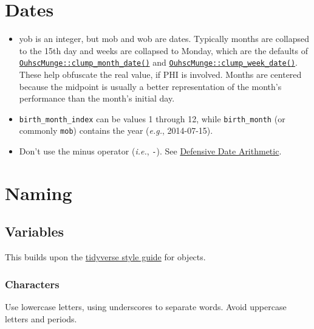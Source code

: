 \documentclass[
]{book}
\begin{document}
\hypertarget{style-dates}{%
\section{Dates}\label{style-dates}}

\begin{itemize}
\item
  yob is an integer, but mob and wob are dates. Typically months are collapsed to the 15th day and weeks are collapsed to Monday, which are the defaults of \href{http://ouhscbbmc.github.io/OuhscMunge/reference/clump_date.html}{\texttt{OuhscMunge::clump\_month\_date()}} and \href{http://ouhscbbmc.github.io/OuhscMunge/reference/clump_date.html}{\texttt{OuhscMunge::clump\_week\_date()}}. These help obfuscate the real value, if PHI is involved. Months are centered because the midpoint is usually a better representation of the month's performance than the month's initial day.
\item
  \texttt{birth\_month\_index} can be values 1 through 12, while \texttt{birth\_month} (or commonly \texttt{mob}) contains the year (\emph{e.g.}, 2014-07-15).
\item
  Don't use the minus operator (\emph{i.e.}, \texttt{-}). See \protect\hyperlink{coding-defensive-date-arithmetic}{Defensive Date Arithmetic}.
\end{itemize}

\hypertarget{naming}{%
\section{Naming}\label{naming}}

\hypertarget{style-naming-variables}{%
\subsection{Variables}\label{style-naming-variables}}

This builds upon the \href{https://style.tidyverse.org/syntax.html\#object-names}{tidyverse style guide} for objects.

\hypertarget{style-naming-variables-characters}{%
\subsubsection{Characters}\label{style-naming-variables-characters}}

Use lowercase letters, using underscores to separate words. Avoid uppercase letters and periods.
\end{document}
